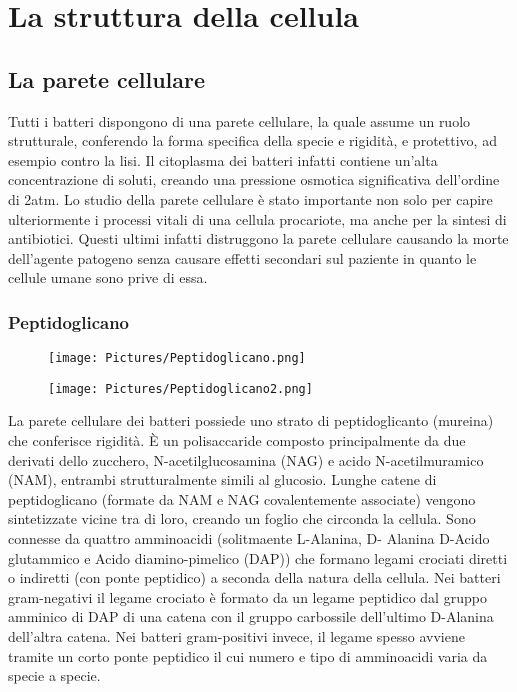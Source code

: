 \chapter{La struttura della cellula}
\section{La parete cellulare}
Tutti i batteri dispongono di una parete cellulare, la quale assume un ruolo strutturale, conferendo la forma specifica della specie e rigidità, e 
protettivo, ad esempio contro la lisi. Il citoplasma dei batteri infatti contiene un’alta concentrazione di soluti, creando una pressione osmotica 
significativa dell’ordine di 2atm. Lo studio della parete cellulare è stato importante non solo per capire 
ulteriormente i processi vitali di una cellula procariote, ma anche per la sintesi di antibiotici. Questi ultimi infatti distruggono la parete cellulare causando la morte dell'agente patogeno senza causare effetti secondari sul paziente
in quanto le cellule umane sono prive di essa.
\subsection{Peptidoglicano}
\begin{multicols}{2}
\begin{figure}[H]
	\texttt{[image: Pictures/Peptidoglicano.png]}
\end{figure}    
\columnbreak
\begin{figure}[H]
	\texttt{[image: Pictures/Peptidoglicano2.png]}
\end{figure}       
\end{multicols}
La parete cellulare dei batteri possiede uno strato di peptidoglicanto (mureina) che conferisce rigidit\`a. \`E
un polisaccaride composto principalmente da due derivati dello zucchero, N-acetilglucosamina (NAG) e acido N-acetilmuramico (NAM), entrambi strutturalmente 
simili al glucosio. Lunghe catene di peptidoglicano (formate da NAM e NAG covalentemente associate) vengono sintetizzate vicine tra di loro, creando un 
foglio che circonda la cellula. Sono connesse da quattro amminoacidi (solitmaente L-Alanina, D- Alanina D-Acido glutammico e Acido diamino-pimelico (DAP)) che formano legami crociati 
diretti o indiretti (con ponte peptidico) a seconda della natura della cellula. Nei batteri gram-negativi il legame crociato è formato da un legame peptidico dal gruppo amminico di DAP di una 
catena con il gruppo carbossile dell’ultimo D-Alanina dell’altra catena. Nei batteri gram-positivi invece, il legame spesso avviene tramite un corto ponte 
peptidico il cui numero e tipo di amminoacidi varia da specie a specie. 
